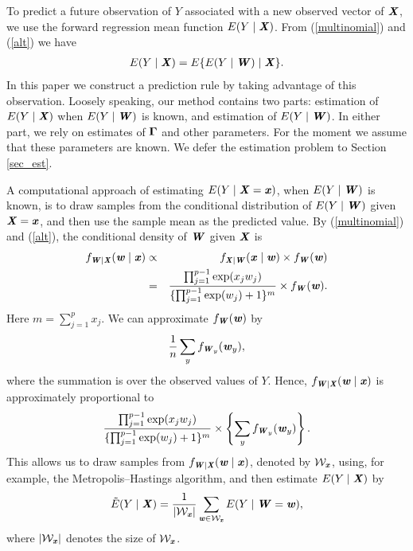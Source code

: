 \documentclass[12pt]{article}
\def \bfitw{\mbox{\textbf{\textit{w}}}}
\def \bfitx{\mbox{\textbf{\textit{x}}}}
\def \sbfitw{\mbox{\scriptsize\textbf{\textit{w}}}}
\def \sbfitx{\mbox{\scriptsize\textbf{\textit{x}}}}
\def \tbfitx{\mbox{\tiny\textbf{\textit{x}}}}
\def \bfitW{\mbox{\textbf{\textit{W}}}}
\def \sbfitW{\mbox{\scriptsize\textbf{\textit{W}}}}
\def \bfitX{\mbox{\textbf{\textit{X}}}}
\def \sbfitX{\mbox{\scriptsize\textbf{\textit{X}}}}
\def \bfGamma{\mbox{\boldmath $\Gamma$}}
\begin{document}
To predict a future observation of $Y$ associated with a new observed vector of $\bfitX$, we use the forward regression mean function $E(Y \mid \bfitX)$. %
From (\ref{multinomial}) and (\ref{alt}) we have
\begin{eqnarray*}
E(Y \mid \bfitX) = E\{E(Y \mid \bfitW) \mid \bfitX\}.
\end{eqnarray*}
In this paper we construct a prediction rule by taking advantage of this observation. Loosely speaking, our method contains two parts: estimation of $E(Y \mid \bfitX)$ when $E(Y \mid \bfitW)$ is known, and estimation of $E(Y \mid \bfitW)$. In either part, we rely on estimates of $\bfGamma$ and other parameters. For the moment we assume that these parameters are known. We defer the estimation problem to Section \ref{sec_est}.

A computational approach of estimating $E(Y \mid \bfitX = \bfitx)$, when $E(Y \mid \bfitW)$ is known, is to draw samples from the conditional distribution of $E(Y \mid \bfitW)$ given $\bfitX = \bfitx$, and then use the sample mean as the predicted value. By (\ref{multinomial}) and (\ref{alt}), the conditional density of $\bfitW$ given $\bfitX$ is
\begin{eqnarray}
\nonumber
f_{\sbfitW \mid \sbfitX}(\bfitw \mid \bfitx)
&\propto& f_{\sbfitX \mid \sbfitW}(\bfitx \mid \bfitw) \times f_{\sbfitW}(\bfitw) \\ \nonumber
&=& \frac{\prod_{j = 1}^{p - 1} \exp(x_{j} w_{j})}{\{\prod_{j = 1}^{p - 1} \exp(w_{j}) + 1\}^{m}} \times f_{\sbfitW}(\bfitw) .
\end{eqnarray}
Here $m = \sum_{j = 1}^p x_j$. We can approximate $f_{\sbfitW}(\bfitw)$ by
\begin{eqnarray*}
\frac{1}{n}\sum_y f_{\sbfitW_y}(\bfitw_y),
\end{eqnarray*}
where the summation is over the observed values of $Y$. Hence, $f_{\sbfitW \mid \sbfitX}(\bfitw \mid \bfitx)$ is approximately proportional to
$$\frac{\prod_{j = 1}^{p - 1} \exp(x_{j} w_{j})}{\{\prod_{j = 1}^{p - 1} \exp(w_{j}) + 1\}^{m}} \times \left\{\sum_y f_{\sbfitW_y}(\bfitw_y)\right\}.$$
This allows us to draw samples from $f_{\sbfitW \mid \sbfitX}(\bfitw \mid \bfitx)$, denoted by $\mathcal{W}_{\sbfitx}$, using, for example, the Metropolis--Hastings algorithm, and then estimate $E(Y \mid \bfitX)$ by
\begin{eqnarray}\label{pred_11}
\tilde{E}(Y \mid \bfitX) = \frac{1}{|\mathcal{W}_{\sbfitx}|} \sum_{\sbfitw \in \mathcal{W}_{\tbfitx}} E(Y \mid \bfitW  = \bfitw),
\end{eqnarray}
where $|\mathcal{W}_{\sbfitx}|$ denotes the size of $\mathcal{W}_{\sbfitx}$.
\end{document}
